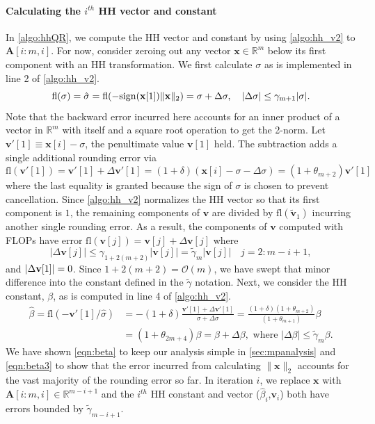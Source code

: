 \documentclass[review,onefignum,onetabnum]{siamart190516}
\newcommand{\R}{\mathbb{R}}
\newcommand{\dd}{\delta}
\newcommand{\tth}{\theta}
\newcommand{\bb}[1]{\mathbf{#1}}
\newcommand{\fl}{\mathrm{fl}}
\newcommand{\cO}{\mathcal{O}}
\begin{document}
\paragraph{Calculating the $i^{th}$ HH vector and constant} 
In \cref{algo:hhQR}, we compute the HH vector and constant by using \cref{algo:hh_v2} to $\bb{A}[i:m,i]$.
For now, consider zeroing out any vector $\bb{x}\in\R^m$ below its first component with an HH transformation.
We first calculate $\sigma$ as is implemented in line 2 of \cref{algo:hh_v2}.
\begin{equation}
\label{eqn:sigma}
\fl(\sigma) = \hat{\sigma} = \rm{fl}(-\rm{sign}(\bb{x}[1])\|\bb{x}\|_2) = \sigma + \Delta \sigma,\quad |\Delta\sigma| \leq \gamma_{m+1}|\sigma|.
\end{equation}
Note that the backward error incurred here accounts for an inner product of a vector in $\R^{m}$ with itself and a square root operation to get the 2-norm. 
Let $\bb{v}'[1]\equiv \bb{x}[i]-\sigma$, the penultimate value $\bb{v}[1]$ held. 
The subtraction adds a single additional rounding error via
\begin{equation}
	\fl(\bb{v}'[1]) =\bb{v}'[1] + \Delta \bb{v}'[1] = (1+\dd) (\bb{x}[i]-\sigma-\Delta\sigma)= (1+\tth_{m+2})\bb{v}'[1]
\end{equation}
where the last equality is granted because the sign of $\sigma$ is chosen to prevent cancellation.
Since \cref{algo:hh_v2} normalizes the HH vector so that its first component is $1$, the remaining components of $\bb{v}$ are divided by $\fl(\tilde{\bb{v}}_1)$ incurring another single rounding error.
As a result, the components of $\bb{v}$ computed with FLOPs have error $\fl(\bb{v}[j])	= \bb{v}[j] + \Delta \bb{v}[j]$ where 
\begin{equation}
|\Delta \bb{v}[j]|\leq \gamma_{1+2(m+2)}|\bb{v}[j]| =\tilde{\gamma}_{m}|\bb{v}[j]|\quad j=2:m-i+1,\label{eqn:vbound}
\end{equation}
and $|\Delta {\bf v}[1]| = 0$.
Since $1+2(m+2) = \cO(m)$, we have swept that minor difference into the constant defined in the $\tilde{\gamma}$ notation.
Next, we consider the HH constant, $\beta$, as is computed in line 4 of \cref{algo:hh_v2}.
\begin{align}
\hat{\beta} = \fl\left(-\bb{v}'[1]/\hat{\sigma}\right) &=-(1+\dd)\frac{\bb{v}'[1]+\Delta \bb{v}'[1]}{\sigma + \Delta\sigma} = \frac{(1+\dd)(1+\tth_{m+2})}{(1+\tth_{m+1})}\beta \label{eqn:beta}\\
&= (1+\tth_{2m+4})\beta= \beta + \Delta \beta,\text{ where } |\Delta\beta| \leq \tilde{\gamma}_{m} \beta\label{eqn:beta3}.
\end{align}
We have shown \cref{eqn:beta} to keep our analysis simple in \cref{sec:mpanalysis} and \cref{eqn:beta3} to show that the error incurred from calculating $\|\bb{x}\|_2$ accounts for the vast majority of the rounding error so far.
In iteration $i$, we replace $\bb{x}$ with $\bb{A}[i:m,i]\in\R^{m-i+1}$ and the $i^{th}$ HH constant and vector ($\hat{\beta}_i$,$\bb{v}_i$) both have errors bounded by $\tilde{\gamma}_{m-i+1}$.
\end{document}

